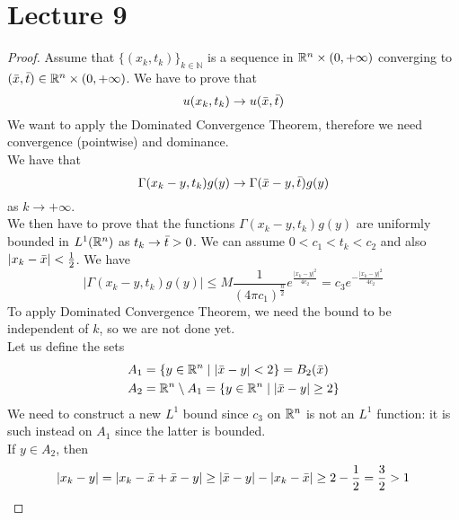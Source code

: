 \newpage
\section{Lecture 9}
\begin{ProofBox}
    \begin{proof}
    Assume that $\{(x_k, t_k)\}_{k \in \mathbb{N}}$ is a sequence in $\mathbb{R}^n \times (0,+\infty)$ converging to $(\Bar{x}, \Bar{t}) \in \mathbb{R}^n \times (0,+\infty)$. We have to prove that 
    \begin{equation*}
        u(x_k,t_k) \rightarrow u(\Bar{x}, \Bar{t})
    \end{equation*}
    We want to apply the Dominated Convergence Theorem, therefore we need convergence (pointwise) and dominance.\\
    We have that 
    \begin{equation*}
        \Gamma(x_k - y, t_k) g(y) \rightarrow \Gamma(\Bar{x} - y, \Bar{t}) g(y)
    \end{equation*}
    as $k \rightarrow +\infty$.\\
    We then have to prove that the functions $\Gamma(x_k - y, t_k) g(y)$ are uniformly bounded in $L^1(\mathbb{R}^n)$ as $t_k \rightarrow \Bar{t} > 0$. We can assume $0 < c_1 < t_k < c_2$ and also $|x_k - \Bar{x}| < \frac{1}{2}$. We have 
    \begin{equation*}
        |\Gamma(x_k - y, t_k) g(y)| \leq M \frac{1}{(4 \pi c_1) ^ \frac{n}{2}} e^\frac{|x_k - y|^2}{4 c_2} = c_3 e^{-\frac{|x_k - y|^2}{4c_2}}
    \end{equation*}
    To apply Dominated Convergence Theorem, we need the bound to be independent of $k$, so we are not done yet.\\
    Let us define the sets 
    \begin{equation*}
        \begin{split}
            A_1 &= \{y \in \mathbb{R}^n \mid |\Bar{x}-y| < 2\} = B_2(\Bar{x}) \\
            A_2 &= \mathbb{R}^n \setminus A_1 = \{y \in \mathbb{R}^n \mid |\Bar{x}-y| \geq 2\}
        \end{split}
    \end{equation*}
    We need to construct a new $L^1$ bound since $c_3$ on $\mathbb{R}^n$ is not an $L^1$ function: it is such instead on $A_1$ since the latter is bounded. \\
    If $y \in A_2$, then
    \begin{equation*}
        |x_k - y| = |x_k -\Bar{x} + \Bar{x} - y| \geq |\Bar{x}-y| - |x_k - \Bar{x}| \geq 2 -\frac{1}{2} = \frac{3}{2} > 1

\end{equation*}
\end{proof}
\end{ProofBox}
